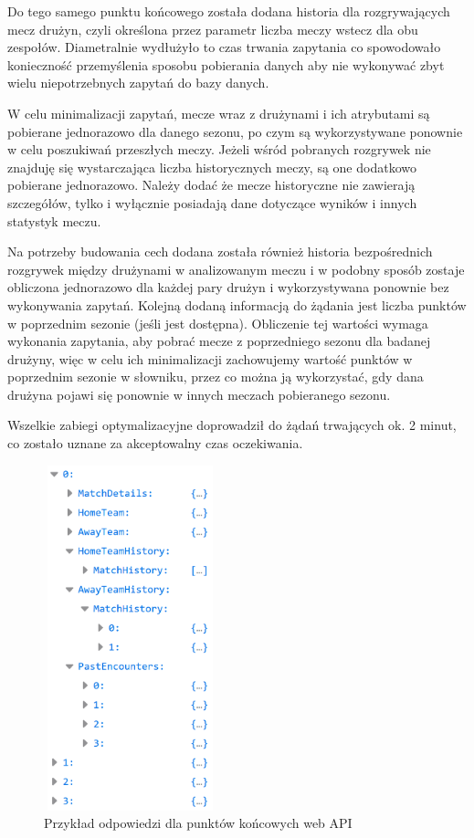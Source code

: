     Do tego samego punktu końcowego została dodana historia dla rozgrywających mecz drużyn, czyli określona przez parametr liczba meczy wstecz dla obu zespołów. Diametralnie wydłużyło to czas trwania zapytania co spowodowało konieczność przemyślenia sposobu pobierania danych aby nie wykonywać zbyt wielu niepotrzebnych zapytań do bazy danych.
    
    W celu minimalizacji zapytań, mecze wraz z drużynami i ich atrybutami są pobierane jednorazowo dla danego sezonu, po czym są wykorzystywane ponownie w celu poszukiwań przeszłych meczy. Jeżeli wśród pobranych rozgrywek nie znajduję się wystarczająca liczba historycznych meczy, są one dodatkowo pobierane jednorazowo. Należy dodać że mecze historyczne nie zawierają szczegółów, tylko i wyłącznie posiadają dane dotyczące wyników i innych statystyk meczu.
    
    Na potrzeby budowania cech dodana została również historia bezpośrednich rozgrywek między drużynami w analizowanym meczu i w podobny sposób zostaje obliczona jednorazowo dla każdej pary drużyn i wykorzystywana ponownie bez wykonywania zapytań. Kolejną dodaną informacją do żądania jest liczba punktów w poprzednim sezonie (jeśli jest dostępna). Obliczenie tej wartości wymaga wykonania zapytania, aby pobrać mecze z poprzedniego sezonu dla badanej drużyny, więc w celu ich minimalizacji zachowujemy wartość punktów w poprzednim sezonie w słowniku, przez co można ją wykorzystać, gdy dana drużyna pojawi się ponownie w innych meczach pobieranego sezonu.
    
    Wszelkie zabiegi optymalizacyjne doprowadził do żądań trwających ok. 2 minut, co zostało uznane za akceptowalny czas oczekiwania.
    
    \begin{figure}[H] 
        \centering\includegraphics[width=5cm,height=10cm]{figures/example_response.png}
        \caption{Przykład odpowiedzi dla punktów końcowych web API}
        \label{fig:example_API_response}
    \end{figure}
    
